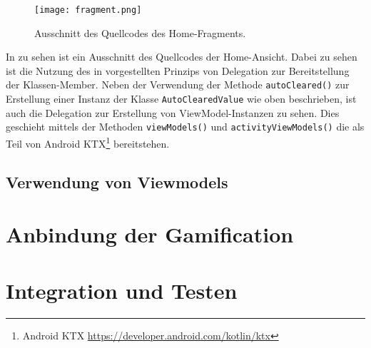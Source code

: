 \begin{figure}[H]
    \texttt{[image: fragment.png]}
    \caption{Ausschnitt des Quellcodes des Home-Fragments.}\label{fig:fragment}
\end{figure}

\newpage

In  zu sehen ist ein Ausschnitt des Quellcodes der Home-Ansicht. Dabei zu sehen ist die Nutzung des in  vorgestellten Prinzips von Delegation zur Bereitstellung der Klassen-Member. Neben der Verwendung der Methode \texttt{autoCleared()} zur Erstellung einer Instanz der Klasse \texttt{AutoClearedValue} wie oben beschrieben, ist auch die Delegation zur Erstellung von ViewModel-Instanzen zu sehen. Dies geschieht mittels der Methoden \texttt{viewModels()} und \texttt{activityViewModels()} die als Teil von Android KTX\footnote{Android KTX \url{https://developer.android.com/kotlin/ktx}} bereitstehen.

\subsection{Verwendung von Viewmodels}



\section{Anbindung der Gamification}

\section{Integration und Testen}
